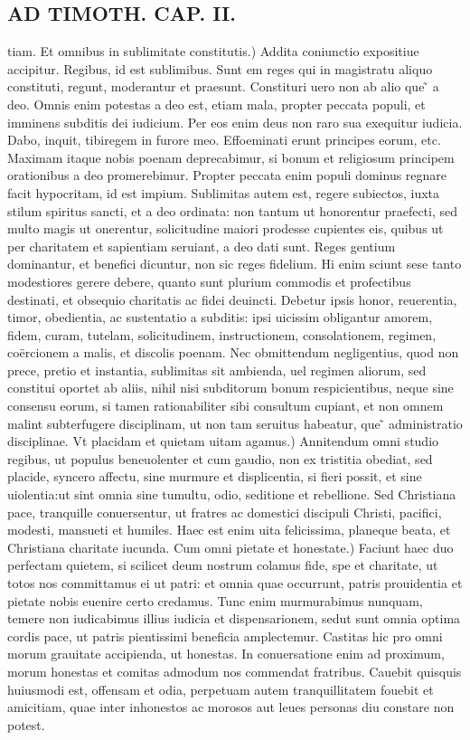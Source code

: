 \documentclass{article}
\begin{document}
\begin{pages}
\section*{AD TIMOTH. CAP. II. }
\marginpar{[ p.481 ]}\pstart tiam. Et omnibus in sublimitate constitutis.) Addita coniunctio expositiue accipitur. Regibus, id est sublimibus. Sunt em reges qui in magistratu aliquo constituti, regunt, moderantur et praesunt. Constituri uero non ab alio que ̃ a deo. Omnis enim potestas a deo est, etiam mala, propter peccata populi, et imminens subditis dei iudicium. Per eos enim deus non raro sua exequitur iudicia. Dabo, inquit, tibiregem in furore meo. Effoeminati erunt principes eorum, etc. Maximam itaque  nobis poenam deprecabimur, si bonum et religiosum principem orationibus a deo promerebimur. Propter peccata enim populi dominus regnare facit hypocritam, id est impium. Sublimitas autem est, regere subiectos, iuxta stilum spiritus sancti, et a deo ordinata: non tantum ut honorentur praefecti, sed multo magis ut onerentur, solicitudine maiori prodesse cupientes eis, quibus ut per charitatem et sapientiam seruiant, a deo dati sunt. Reges gentium dominantur, et benefici dicuntur, non sic reges fidelium. Hi enim sciunt sese tanto modestiores gerere debere, quanto sunt plurium commodis et profectibus destinati, et obsequio charitatis ac fidei deuincti. Debetur ipsis honor, reuerentia, timor, obedientia, ac sustentatio a subditis: ipsi uicissim obligantur amorem, fidem, curam, tutelam, solicitudinem, instructionem, consolationem, regimen, coërcionem a malis, et discolis poenam. Nec obmittendum negligentius, quod non prece, pretio et instantia, sublimitas sit ambienda, uel regimen aliorum, sed constitui oportet ab aliis, nihil nisi subditorum bonum respicientibus, neque sine consensu eorum, si tamen rationabiliter sibi consultum cupiant, et non omnem malint subterfugere disciplinam, ut non tam seruitus habeatur, que ̃ administratio disciplinae. Vt placidam et quietam uitam agamus.) Annitendum omni studio regibus, ut populus beneuolenter et cum gaudio, non ex tristitia obediat, sed placide, syncero affectu, sine murmure et displicentia, si fieri possit, et sine uiolentia:ut sint omnia sine tumultu, odio, seditione et rebellione. Sed Christiana pace, tranquille conuersentur, ut fratres ac domestici discipuli Christi, pacifici, modesti, mansueti et humiles. Haec est enim uita felicissima, planeque beata, et Christiana charitate iucunda. Cum omni pietate et honestate.) Faciunt haec duo perfectam quietem, si scilicet deum nostrum colamus fide, spe et charitate, ut totos nos committamus ei ut patri: et omnia quae occurrunt, patris prouidentia et pietate nobis euenire certo credamus. Tunc enim murmurabimus nunquam, temere non iudicabimus illius iudicia et dispensarionem, sedut sunt omnia optima cordis pace, ut patris pientissimi beneficia amplectemur. Castitas hic pro omni morum grauitate accipienda, ut honestas. In conuersatione enim ad proximum, morum honestas et comitas admodum nos commendat fratribus. Cauebit quisquis huiusmodi est, offensam et odia, perpetuam autem tranquillitatem fouebit et amicitiam, quae inter inhonestos ac morosos aut leues personas diu constare non potest.  \pend

\end{pages}
\end{document}
